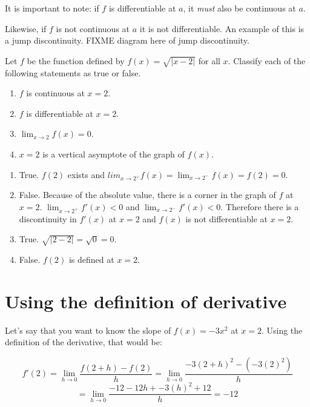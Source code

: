 It is important to note: if $f$ is differentiable at $a$, it \emph{must} also be continuous at $a$. 

Likewise, if $f$ is not continuous at $a$ it is not differentiable. An example of this is a jump discontinuity. FIXME diagram here of jump discontinuity. 

\begin{Exercise} Let $f$ 
	be the function defined by $f(x) = \sqrt{|x - 2|}$ for all $x$. 
	Classify each of the following statements as true or false. 
	\begin{enumerate}
		\item $f$ is continuous at $x = 2$. 
		\item $f$ is differentiable at $x = 2$.
		\item $\lim_{x \to 2} f(x) = 0$.
		\item $x = 2$ is a vertical asymptote of the graph of $f(x)$. 
	\end{enumerate}
\end{Exercise}

\begin{Answer}[ref=diff1]
	\begin{enumerate}
		\item True. $f(2)$ exists and $lim_{x \to 2^+}f(x) = 
		\lim_{x \to 2^-}f(x) = f(2) = 0$. 
		\item False. Because of the absolute value, there is a corner in 
		the graph of $f$ at $x=2$. $\lim_{x \to 2^+}f'(x) < 0$ and 
		$\lim_{x \to 2^-}f'(x) < 0$. Therefore there is a discontinuity in 
		$f'(x)$ at $x = 2$ and $f(x)$ is not differentiable at $x = 2$. 
		\item True. $\sqrt{|2-2|} = \sqrt{0} = 0$.
		\item False. $f(2)$ is defined at $x = 2$. 
	\end{enumerate}
\end{Answer}

\section{Using the definition of derivative}

Let's say that you want to know the slope of $f(x) = -3x^2$ at $x = 2$.
Using the definition of the derivative, that would be:

$$f'(2) = \lim_{h \to 0}\frac{f(2 + h) - f(2)}{h} 
= \lim_{h \to 0}\frac{-3(2 + h)^2- \left(-3(2)^2\right)}
{h} $$
$$= \lim_{h \to 0}\frac{-12 - 12h + 
-3(h)^2 + 12}{h} = -12$$ 


